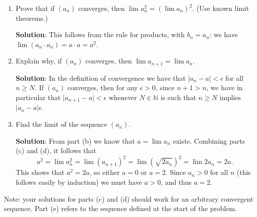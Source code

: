 \documentclass[letterpaper,12pt]{article}
\newcommand{\N}{\mathbb{N}}
\newcommand{\abs}[1]{\lvert #1\rvert}
\begin{document}
\begin{enumerate}
\begin{enumerate}
 \item Prove that if $(a_n)$ converges, then $\lim a_n^2 = (\lim a_n)^2$. (Use known limit theorems.)
 
\bigskip

{\bf Solution}:  This follows from the rule for products, with $b_n=a_n$: we have $\lim (a_n\cdot a_n) = a\cdot a = a^2$.
 
 \item Explain why, if $(a_n)$ converges, then $\lim a_{n+1} = \lim a_n$.
  
\bigskip

{\bf Solution}: In the definition of convergence we have that $\abs{a_n-a}<\epsilon$ for all $n\geq N$. If $(a_n)$ converges, then for any $\epsilon>0$, since $n+1>n$, we have in particular that $\abs{a_{n+1}-a}<\epsilon$ whenever $N\in\N$ is such that $n\geq N$ implies $\abs{a_n-a}\epsilon$.

 \item Find the limit of the sequence $(a_n)$.
 
\bigskip

{\bf Solution}: From part (b) we know that $a = \lim a_n$ exists. Combining parts (c) and (d), it follows that
\[
a^2 = \lim a_n^2 = \lim (a_{n+1})^2 = \lim (\sqrt{2a_n})^2 = \lim 2a_n = 2a.
\]
This shows that $a^2=2a$, so either $a=0$ or $a=2$. Since $a_n>0$ for all $n$ (this follows easily by induction) we must have $a>0$, and thus $a=2$.

\end{enumerate}
Note: your solutions for parts (c) and (d) should work for an arbitrary convergent sequence. Part (e) refers to the sequence defined at the start of the problem.



\end{enumerate}
\end{document}
